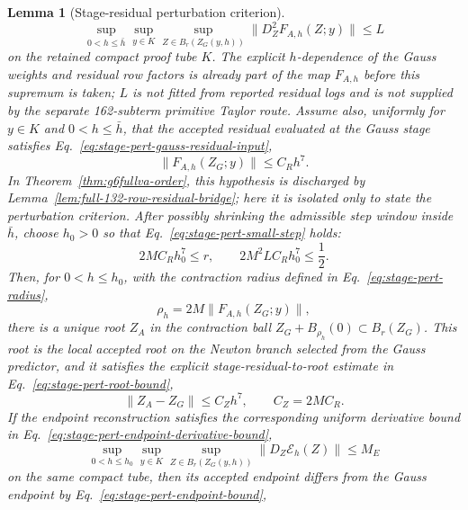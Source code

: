 \documentclass[preprint,12pt]{elsarticle}
\newtheorem{lemma}{Lemma}
\begin{document}
\begin{lemma}[Stage-residual perturbation criterion]
\begin{equation}
\label{eq:stage-pert-second-derivative-bound}
  \sup_{0<h\le \bar h}\sup_{y\in K}\sup_{Z\in B_r(Z_G(y,h))}
  \|D_Z^2F_{A,h}(Z;y)\|\le L
\end{equation}
on the retained compact proof tube \(K\).  The explicit \(h\)-dependence of
the Gauss weights and residual row factors is already part of the map
\(F_{A,h}\) before this supremum is taken; \(L\) is not fitted from
reported residual logs and is not supplied by the separate 162-subterm
primitive Taylor route.  Assume also, uniformly for \(y\in K\) and
\(0<h\le\bar h\), that the accepted residual evaluated at the Gauss stage
satisfies Eq.~\eqref{eq:stage-pert-gauss-residual-input},
\begin{equation}
\label{eq:stage-pert-gauss-residual-input}
  \|F_{A,h}(Z_G;y)\| \le C_R h^7 .
\end{equation}
In Theorem~\ref{thm:g6fullva-order}, this hypothesis is discharged by
Lemma~\ref{lem:full-132-row-residual-bridge}; here it is isolated only to
state the perturbation criterion.
After possibly shrinking the admissible step window inside \(\bar h\), choose
\(h_0>0\) so that Eq.~\eqref{eq:stage-pert-small-step} holds:
\begin{equation}
\label{eq:stage-pert-small-step}
  2MC_Rh_0^7\le r,\qquad 2M^2LC_Rh_0^7\le \frac12 .
\end{equation}
Then, for \(0<h\le h_0\), with
the contraction radius defined in Eq.~\eqref{eq:stage-pert-radius},
\begin{equation}
\label{eq:stage-pert-radius}
  \rho_h=2M\|F_{A,h}(Z_G;y)\|,
\end{equation}
there is a unique root \(Z_A\) in the contraction ball
\(Z_G+B_{\rho_h}(0)\subset B_r(Z_G)\).  This root is the local accepted
root on the Newton branch selected from the Gauss predictor, and it satisfies
the explicit stage-residual-to-root estimate in
Eq.~\eqref{eq:stage-pert-root-bound},
\begin{equation}
\label{eq:stage-pert-root-bound}
  \|Z_A-Z_G\|\le C_Zh^7,\qquad C_Z=2MC_R .
\end{equation}
If the endpoint reconstruction satisfies the corresponding uniform derivative
bound in Eq.~\eqref{eq:stage-pert-endpoint-derivative-bound},
\begin{equation}
\label{eq:stage-pert-endpoint-derivative-bound}
  \sup_{0<h\le h_0}\sup_{y\in K}
  \sup_{Z\in B_r(Z_G(y,h))}
  \|D_Z\mathcal E_h(Z)\|\le M_E
\end{equation}
on the same compact tube, then its accepted endpoint differs from the Gauss
endpoint by Eq.~\eqref{eq:stage-pert-endpoint-bound},

\end{lemma}
\end{document}
